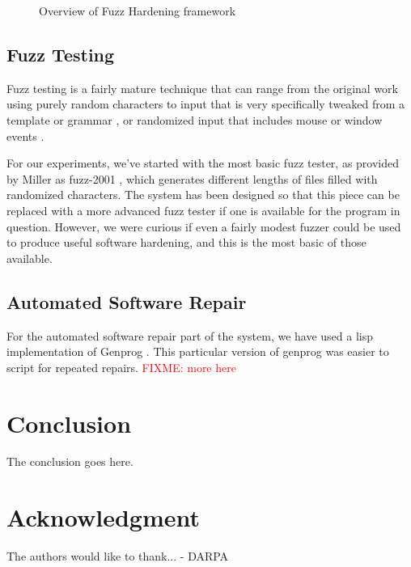 \documentclass[conference]{IEEEtran}
\newcommand{\FIXME}[1]{\textcolor{red}{FIXME: #1}}
\begin{document}
\begin{figure*}[htb]
  
  \caption{Overview of Fuzz Hardening framework}
  \label{fig:overview}
\end{figure*}

\subsection{Fuzz Testing}

Fuzz testing is a fairly mature technique that can range from the original work
using purely random characters \cite{Miller1990,Miller1995} to input that is
very specifically tweaked from a template or grammar \cite{modern,fuzz,papers}, or
randomized input that includes mouse or window events \cite{Miller2006}.

For our experiments, we've started with the most basic fuzz tester,
as provided by Miller as fuzz-2001 \cite{Millerfuzzwebsite}, which generates
different lengths of files filled with randomized characters.   The system has
been designed so that this piece can be replaced with a more advanced fuzz
tester if one is available for the program in question.  However, we were
curious if even a fairly modest fuzzer could be used to produce useful software
hardening, and this is the most basic of those available.

\subsection{Automated Software Repair}

For the automated software repair part of the system, we have used a lisp
implementation of Genprog \cite{genprogpapers}.   This particular version of
genprog was easier to script for repeated repairs.  \FIXME{more here}



\section{Conclusion}
The conclusion goes here.

\section*{Acknowledgment}

The authors would like to thank...
- DARPA



\end{document}
